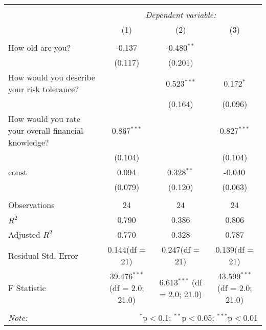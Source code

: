 \begin{table}[!htbp] \centering
\begin{tabular}{@{\extracolsep{5pt}}lccc}
\\[-1.8ex]\hline
\hline \\[-1.8ex]
& \multicolumn{3}{c}{\textit{Dependent variable:}} \
\cr \cline{3-4}
\\[-1.8ex] & (1) & (2) & (3) \\
\hline \\[-1.8ex]
 How old are you? & -0.137$^{}$ & -0.480$^{**}$ & \\
  & (0.117) & (0.201) & \\
 How would you describe your risk tolerance? & & 0.523$^{***}$ & 0.172$^{*}$ \\
  & & (0.164) & (0.096) \\
 How would you rate your overall financial knowledge? & 0.867$^{***}$ & & 0.827$^{***}$ \\
  & (0.104) & & (0.104) \\
 const & 0.094$^{}$ & 0.328$^{**}$ & -0.040$^{}$ \\
  & (0.079) & (0.120) & (0.063) \\
\hline \\[-1.8ex]
 Observations & 24 & 24 & 24 \\
 $R^2$ & 0.790 & 0.386 & 0.806 \\
 Adjusted $R^2$ & 0.770 & 0.328 & 0.787 \\
 Residual Std. Error & 0.144(df = 21) & 0.247(df = 21) & 0.139(df = 21)  \\
 F Statistic & 39.476$^{***}$ (df = 2.0; 21.0) & 6.613$^{***}$ (df = 2.0; 21.0) & 43.599$^{***}$ (df = 2.0; 21.0) \\
\hline
\hline \\[-1.8ex]
\textit{Note:} & \multicolumn{3}{r}{$^{*}$p$<$0.1; $^{**}$p$<$0.05; $^{***}$p$<$0.01} \\
\end{tabular}
\end{table}